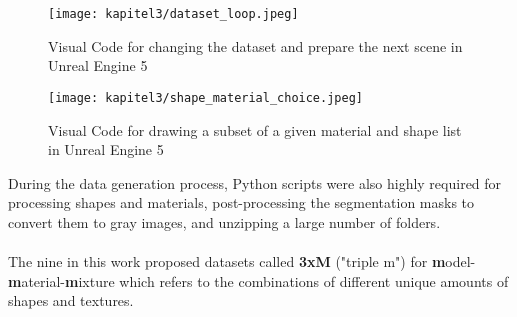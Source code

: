 		\begin{figure}[h]
			\centering
			\texttt{[image: kapitel3/dataset\_loop.jpeg]}
			\caption[Visual Code for changing the dataset and prepare the next scene in Unreal Engine 5 by Tobia Ippolito]{Visual Code for changing the dataset and prepare the next scene in Unreal Engine 5}
			\label{img:ue5_dataset_loop}
		\end{figure}
		
		\begin{figure}[h]
			\centering
			\texttt{[image: kapitel3/shape\_material\_choice.jpeg]}
			\caption[Visual Code for drawing a subset of a given material and shape list in Unreal Engine 5 by Tobia Ippolito]{Visual Code for drawing a subset of a given material and shape list in Unreal Engine 5}
			\label{img:ue5_material_shape_choice}
		\end{figure}
		
		During the data generation process, Python scripts were also highly required for processing shapes and materials, post-processing the segmentation masks to convert them to gray images, and unzipping a large number of folders.\\
		\\
		The nine in this work proposed datasets called \textbf{3xM} ("triple m") for \textbf{m}odel-\textbf{m}aterial-\textbf{m}ixture which refers to the combinations of different unique amounts of shapes and textures.
		

